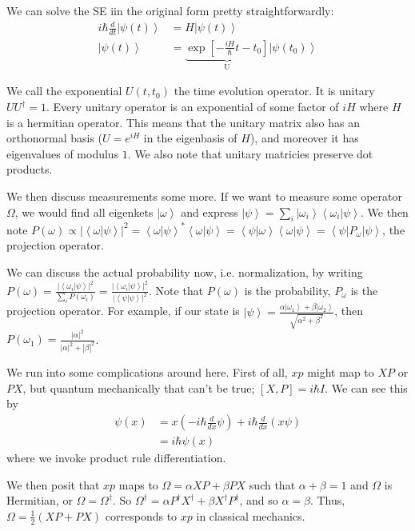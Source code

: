 \documentclass[10pt]{report}
\newcommand{\bra}[1]{\left<#1\right|}
\newcommand{\ket}[1]{\left|#1\right>}
\newcommand{\dotp}[2]{\left<#1\left.\right|#2\right>}
\newcommand{\rd}[2]{\frac{d#1}{d#2}}
\newcommand{\abs}[1]{\left|#1\right|}
\begin{document}
We can solve the SE iin the original form pretty straightforwardly:
\begin{align}
	i\hbar\rd{}{t}\ket{\psi(t)}&=H\ket{\psi(t)}\\
	\ket{\psi(t)} &= \underbrace{\exp\left[ -\frac{iH}{\hbar}t-t_0 \right]}_{\text{U}}\ket{\psi(t_0)}
\end{align}

We call the exponential $U(t,t_0)$ the time evolution operator. It is unitary $UU^\dagger=1$. Every unitary operator is an exponential of some factor of $iH$ where $H$ is a hermitian operator. This means that the unitary matrix also has an orthonormal basis ($U=e^{iH}$ in the eigenbasis of $H$), and moreover it has eigenvalues of modulus $1$. We also note that unitary matricies preserve dot products. 

We then discuss measurements some more. If we want to measure some operator $\Omega$, we would find all eigenkets $\ket{\omega}$ and express $\ket{\psi} = \sum_i \ket{\omega_i}\dotp{\omega_i}{\psi}$. We then note $P(\omega)\propto \abs{\dotp{\omega}{\psi}}^2 = \dotp{\omega}{\psi}^*\dotp{\omega}{\psi}=\dotp{\psi}{\omega}\dotp{\omega}{\psi} = \bra{\psi}P_\omega\ket{\psi}$, the projection operator.

We can discuss the actual probability now, i.e. normalization, by writing $P(\omega)=\frac{\abs{\dotp{\omega_i}{\psi}}^2}{\sum_i P(\omega_i)} = \frac{\abs{\dotp{\omega_i}{\psi}}^2}{\abs{\dotp{\psi}{\psi}}^2}$. Note that $P(\omega)$ is the probability, $P_\omega$ is the projection operator. For example, if our state is $\ket{\psi}=\frac{\alpha\ket{\omega_1}+\beta\ket{\omega_2}}{\sqrt{\alpha^2+\beta^2}}$, then $P(\omega_1)=\frac{\abs{\alpha}^2}{\abs{\alpha}^2+\abs{\beta}^2}$. 

We run into some complications around here. First of all, $xp$ might map to $XP$ or $PX$, but quantum mechanically that can't be true; $[X,P]=i\hbar I$. We can see this by
\begin{align}
	[X,P]\psi(x) &= x\left( -i\hbar\rd{}{x}\psi\right)+ i\hbar\rd{}{x}\left( x\psi \right)\\
	&= i\hbar\psi(x)
\end{align}
where we invoke product rule differentiation. 

We then posit that $xp$ maps to $\Omega=\alpha XP + \beta PX$ such that $\alpha+\beta=1$ and $\Omega$ is Hermitian, or $\Omega=\Omega^\dagger$. So $\Omega^\dagger=\alpha P^\dagger X^\dagger + \beta X^\dagger P^\dagger$, and so $\alpha=\beta$. Thus, $\Omega=\frac{1}{2}\left( XP + PX \right)$ corresponds to $xp$ in classical mechanics. 
\end{document}
